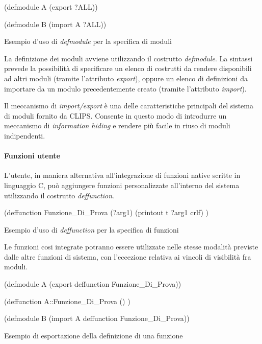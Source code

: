 \begin{program}
\begin{verbatimtab}

(defmodule A
	(export ?ALL))

(defmodule B
	(import A ?ALL))
\end{verbatimtab}
\caption{Esempio d'uso di \emph{defmodule} per la specifica di moduli}
\end{program}

La definizione dei moduli avviene utilizzando il costrutto \emph{defmodule}. La sintassi prevede la possibilità di specificare un elenco di costrutti da rendere disponibili ad altri moduli (tramite l'attributo \emph{export}), oppure un elenco di definizioni da importare da un modulo precedentemente creato (tramite l'attributo \emph{import}).

Il meccanismo di \emph{import/export} è una delle caratteristiche principali del sistema di moduli fornito da CLIPS. Consente in questo modo di introdurre un meccanismo di \emph{information hiding} e rendere più facile in riuso di moduli indipendenti.

\paragraph{Funzioni utente}
L'utente, in maniera alternativa all'integrazione di funzioni native scritte in linguaggio C, può aggiungere funzioni personalizzate all'interno del sistema utilizzando il costrutto \emph{deffunction}.

\begin{program}
\begin{verbatimtab}

(deffunction Funzione_Di_Prova (?arg1)
	(printout t ?arg1 crlf)
)
\end{verbatimtab}
\caption{Esempio d'uso di \emph{deffunction} per la specifica di funzioni}
\end{program}


Le funzioni cosi integrate potranno essere utilizzate nelle stesse modalità previste dalle altre funzioni di sistema, con l'eccezione relativa ai vincoli di visibilità fra moduli.

\begin{program}
\begin{verbatimtab}

(defmodule A
	(export deffunction Funzione_Di_Prova))
	
(deffunction A::Funzione_Di_Prova () )

(defmodule B
	(import A deffunction Funzione_Di_Prova))
\end{verbatimtab}
\caption{Esempio di esportazione della definizione di una funzione}
\end{program}


